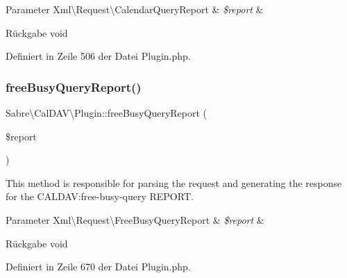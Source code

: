 \begin{DoxyParams}[1]{Parameter}
Xml\textbackslash{}\+Request\textbackslash{}\+Calendar\+Query\+Report & {\em \$report} & \\
\hline
\end{DoxyParams}
\begin{DoxyReturn}{Rückgabe}
void 
\end{DoxyReturn}


Definiert in Zeile 506 der Datei Plugin.\+php.

\mbox{\label{class_sabre_1_1_cal_d_a_v_1_1_plugin_a1bc2721445d98bd38226c76bdd15090d}} 
\subsubsection{\texorpdfstring{free\+Busy\+Query\+Report()}{freeBusyQueryReport()}}
{\footnotesize\ttfamily Sabre\textbackslash{}\+Cal\+D\+A\+V\textbackslash{}\+Plugin\+::free\+Busy\+Query\+Report (\begin{DoxyParamCaption}\item[{\mbox{\hyperlink{class_sabre_1_1_cal_d_a_v_1_1_xml_1_1_request_1_1_free_busy_query_report}{Xml\textbackslash{}\+Request\textbackslash{}\+Free\+Busy\+Query\+Report}}}]{\$report }\end{DoxyParamCaption})\hspace{0.3cm}{\ttfamily [protected]}}

This method is responsible for parsing the request and generating the response for the C\+A\+L\+D\+AV\+:free-\/busy-\/query R\+E\+P\+O\+RT.


\begin{DoxyParams}[1]{Parameter}
Xml\textbackslash{}\+Request\textbackslash{}\+Free\+Busy\+Query\+Report & {\em \$report} & \\
\hline
\end{DoxyParams}
\begin{DoxyReturn}{Rückgabe}
void 
\end{DoxyReturn}


Definiert in Zeile 670 der Datei Plugin.\+php.

\mbox{\label{class_sabre_1_1_cal_d_a_v_1_1_plugin_a3ad4b8e91b5747fda8ab7acdb1b4ca88}} 
